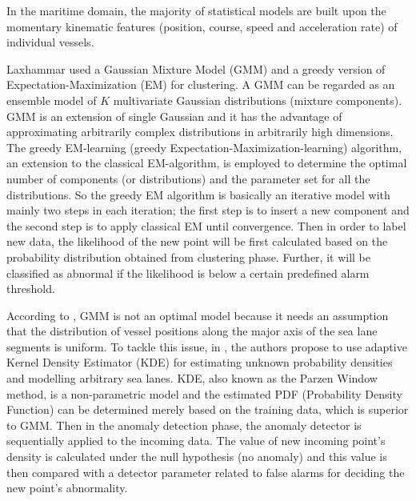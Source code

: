 \documentclass[12pt,glossary]{dalcsthesis}
\begin{document}
In the maritime domain, the majority of statistical models are built upon the momentary kinematic features (position, course, speed and acceleration rate) of individual vessels. 

Laxhammar \cite{gmm} used a Gaussian Mixture Model (GMM)  and a greedy version of Expectation-Maximization (EM) for clustering. A GMM can be regarded as an ensemble model of $K$ multivariate Gaussian distributions (mixture components). GMM is an extension of single Gaussian and it has the advantage of approximating arbitrarily complex distributions in arbitrarily high dimensions.  The greedy EM-learning (greedy Expectation-Maximization-learning) algorithm, an extension to the classical EM-algorithm,  is employed to determine the optimal number of components (or distributions) and the parameter set for all the distributions. So the greedy EM algorithm is basically an iterative model with mainly two steps in each iteration; the first step is to insert a new component and the second step is to apply classical EM until convergence.  Then in order to label new data, the likelihood of the new point will be first calculated based on the probability distribution obtained from clustering phase. Further, it will be classified as abnormal if the likelihood is below a certain predefined alarm threshold.

According to \cite{comparison}, GMM is not an optimal model because it needs an assumption that the distribution of vessel positions along the major axis of the sea lane segments is uniform.  To tackle this issue, in \cite{kde}, the authors propose to use adaptive Kernel Density Estimator (KDE) for estimating unknown probability densities and modelling arbitrary sea lanes.  KDE, also known as the Parzen Window method, is a non-parametric model and the estimated PDF (Probability Density Function) can be determined merely based on the training data, which is superior to GMM. Then in the anomaly detection phase, the anomaly detector is sequentially applied to the incoming data. The value of new incoming point's density is calculated under the null hypothesis (no anomaly) and this value is then compared with a detector parameter related to false alarms for deciding the new point's abnormality.

\end{document}
